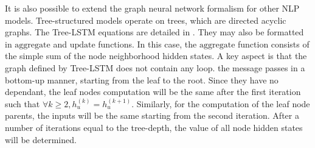 It is also possible to extend the graph neural network formalism for other NLP models.
Tree-structured models operate on trees, which are directed acyclic graphs.
The Tree-LSTM equations are detailed in .
They may also be formatted in  $\text{aggregate}$ and $\text{update}$ functions.
In this case, the $\text{aggregate}$ function consists of the simple sum of the node neighborhood hidden states.
A key aspect is that the graph defined by Tree-LSTM does not contain any loop.
the message passes in a bottom-up manner, starting from the leaf to the root. Since they have no dependant, the leaf nodes computation will be the same after the first iteration such that $\forall k \ge 2, h_u^{(k)} = h_u^{(k+1)}$. Similarly, for the computation of the leaf node parents, the inputs will be the same starting from the second iteration. After a number of iterations equal to the tree-depth, the value of all node hidden states will be determined.


